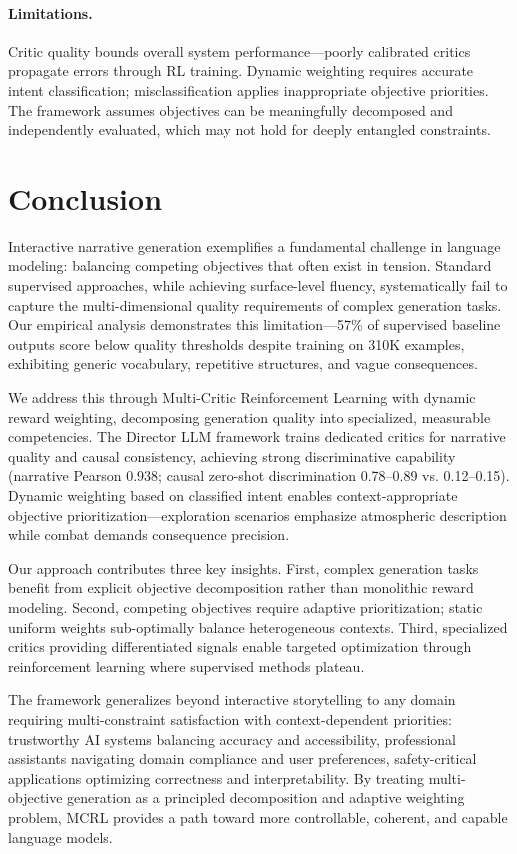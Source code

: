 \documentclass[11pt]{article}
\begin{document}
\paragraph{Limitations.} Critic quality bounds overall system performance—poorly calibrated critics propagate errors through RL training. Dynamic weighting requires accurate intent classification; misclassification applies inappropriate objective priorities. The framework assumes objectives can be meaningfully decomposed and independently evaluated, which may not hold for deeply entangled constraints.


\section{Conclusion}

Interactive narrative generation exemplifies a fundamental challenge in language modeling: balancing competing objectives that often exist in tension. Standard supervised approaches, while achieving surface-level fluency, systematically fail to capture the multi-dimensional quality requirements of complex generation tasks. Our empirical analysis demonstrates this limitation—57\% of supervised baseline outputs score below quality thresholds despite training on 310K examples, exhibiting generic vocabulary, repetitive structures, and vague consequences.

We address this through Multi-Critic Reinforcement Learning with dynamic reward weighting, decomposing generation quality into specialized, measurable competencies. The Director LLM framework trains dedicated critics for narrative quality and causal consistency, achieving strong discriminative capability (narrative Pearson 0.938; causal zero-shot discrimination 0.78--0.89 vs. 0.12--0.15). Dynamic weighting based on classified intent enables context-appropriate objective prioritization—exploration scenarios emphasize atmospheric description while combat demands consequence precision.

Our approach contributes three key insights. First, complex generation tasks benefit from explicit objective decomposition rather than monolithic reward modeling. Second, competing objectives require adaptive prioritization; static uniform weights sub-optimally balance heterogeneous contexts. Third, specialized critics providing differentiated signals enable targeted optimization through reinforcement learning where supervised methods plateau.

The framework generalizes beyond interactive storytelling to any domain requiring multi-constraint satisfaction with context-dependent priorities: trustworthy AI systems balancing accuracy and accessibility, professional assistants navigating domain compliance and user preferences, safety-critical applications optimizing correctness and interpretability. By treating multi-objective generation as a principled decomposition and adaptive weighting problem, MCRL provides a path toward more controllable, coherent, and capable language models.
\end{document}
